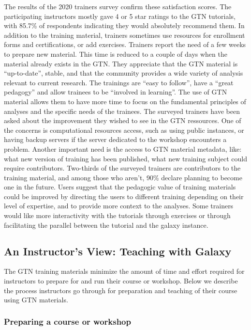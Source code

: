\documentclass[10pt,letterpaper]{article}
\begin{document}
The results of the 2020 trainers survey confirm these satisfaction scores. The participating instructors mostly gave 4 or 5 star ratings to the GTN tutorials, with 85.7\% of respondents indicating they would absolutely recommend them.
In addition to the training material, trainers sometimes use resources for enrollment forms and certifications, or add exercises.
Trainers report the need of a few weeks to prepare new material.
This time is reduced to a couple of days when the material already exists in the GTN\@.
They appreciate that the GTN material is “up-to-date”, stable, and that the community provides a wide variety of analysis relevant to current research.
The trainings are “easy to follow”, have a “great pedagogy” and allow trainees to be “involved in learning”.
The use of GTN material allows them to have more time to focus on the fundamental principles of  analyses and the specific needs of the trainees.
The surveyed trainers have been asked about the improvement they wished to see in the GTN ressources.
One of the concerns is computational resources access, such as using public instances, or having backup servers if the server dedicated to the workshop encounters a problem.
Another important need is the access to GTN material metadata, like:  what new version of training has been published, what new training subject could require contributors.
Two-thirds of the surveyed trainers are contributors to the training material, and among those who aren’t, 90\% declare planning to become one in the future.
Users suggest that the pedagogic value of training materials could be improved by directing the users to different training depending on their level of expertise, and to provide more context to the analyses.
Some trainers would like more interactivity with the tutorials through exercises or through facilitating the parallel between the tutorial and the galaxy instance.


\subsection*{An Instructor's View: Teaching with Galaxy}

The GTN training materials minimize the amount of time and effort required for instructors to prepare for and run their course or workshop. Below we describe the process instructors go through for preparation and teaching of their course using GTN materials.


\subsubsection*{Preparing a course or workshop}
\end{document}
